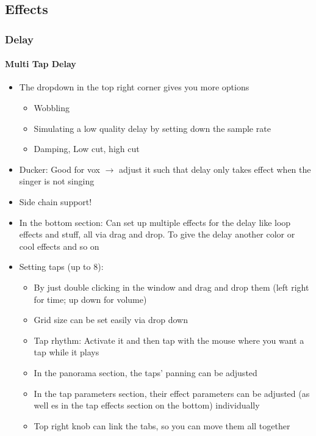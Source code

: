 \documentclass[10pt]{article}
\begin{document}
\subsection{Effects}

\subsubsection{Delay}

\paragraph{Multi Tap Delay}

\begin{itemize}
	\item The dropdown in the top right corner gives you more options
	\begin{itemize}
		\item Wobbling
		\item Simulating a low quality delay by setting down the sample rate
		\item Damping, Low cut, high cut
	\end{itemize}
	\item Ducker: Good for vox $\rightarrow$ adjust it such that delay only takes effect when the singer is not singing
	\item Side chain support!
	\item In the bottom section: Can set up multiple effects for the delay like loop effects and stuff, all via drag and drop. To give the delay another color or cool effects and so on
	\item Setting taps (up to 8):
	\begin{itemize}
		\item By just double clicking in the window and drag and drop them (left right for time; up down for volume)
		\item Grid size can be set easily via drop down
		\item Tap rhythm: Activate it and then tap with the mouse where you want a tap while it plays
		\item In the panorama section, the taps' panning can be adjusted
		\item In the tap parameters section, their effect parameters can be adjusted (as well es in the tap effects section on the bottom) individually
		\item Top right knob can link the tabs, so you can move them all together
	\end{itemize}
\end{itemize}
\end{document}
